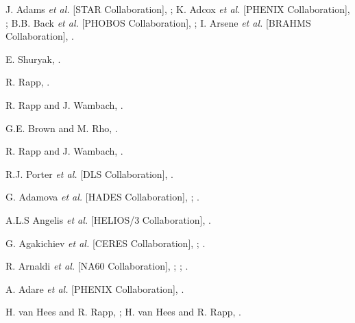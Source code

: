 \documentclass[twocolumn,showpacs,amsmath,amssymb,superscriptaddress,nofootinbib]{revtex4-1}
\begin{document}
\begin{thebibliography}{999}

 J. Adams {\it et al.} [STAR Collaboration], ;
K. Adcox {\it et al.} [PHENIX Collaboration], ; B.B. Back {\it et al.} [PHOBOS Collaboration], ; I. Arsene {\it et al.} [BRAHMS Collaboration], .

 E. Shuryak, .

 R. Rapp, .




 R. Rapp and J. Wambach, .

 G.E. Brown and M. Rho, .

 R. Rapp and J. Wambach, .

 R.J. Porter {\it et al.} [DLS Collaboration], .

 G. Adamova {\it et al.} [HADES Collaboration], ; .

 A.L.S Angelis {\it et al.} [HELIOS/3 Collaboration], .

 G. Agakichiev {\it et al.} [CERES Collaboration], ; .

 R. Arnaldi {\it et al.} [NA60 Collaboration], ; ; .

 A. Adare {\it et al.} [PHENIX Collaboration], .

 H. van Hees and R. Rapp, ; H. van Hees and R. Rapp, .


\end{thebibliography}
\end{document}
